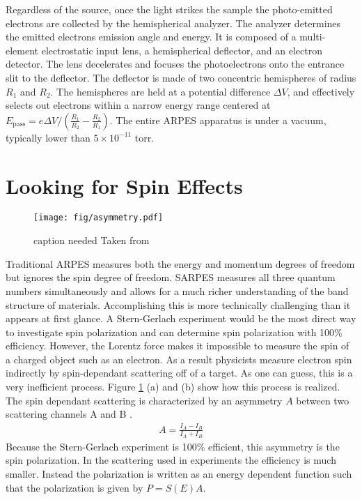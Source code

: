 \documentclass[12pt]{article}
\begin{document}
Regardless of the source, once the light strikes the sample the photo-emitted electrons are collected by the hemispherical analyzer.
The analyzer determines the emitted electrons emission angle and energy.
It is composed of a multi-element electrostatic input lens, a hemispherical deflector, and an electron detector.
The lens decelerates and focuses the photoelectrons onto the entrance slit to the deflector.
The deflector is made of two concentric hemispheres of radius $R_1$ and $R_2$.
The hemispheres are held at a potential difference $\Delta V$, and effectively selects out electrons within a narrow energy range centered at $E_{\text{pass}}=e\Delta V / (\frac{R_1}{R_2}-\frac{R_2}{R_1})$.
The entire ARPES apparatus is under a vacuum, typically lower than $5\times10^{-11}$ torr.

\section{Looking for Spin Effects}
\begin{figure}[h]
  \centering
  \texttt{[image: fig/asymmetry.pdf]}
  \caption[should I put this here?]
  {caption needed Taken from \cite{Okuda-Kimura}}
  \label{fig:asymmetry}
\end{figure}
Traditional ARPES measures both the energy and momentum degrees of freedom but ignores the spin degree of freedom.
SARPES measures all three quantum numbers simultaneously and allows for a much richer understanding of the band structure of materials.
Accomplishing this is more technically challenging than it appears at first glance.
A Stern-Gerlach experiment would be the most direct way to investigate spin polarization and can determine spin polarization with 100\% efficiency.
However, the Lorentz force makes it impossible to measure the spin of a charged object such as an electron.
As a result physicists measure electron spin indirectly by spin-dependant scattering off of a target.
As one can guess, this is a very inefficient process.
Figure \ref{fig:asymmetry} (a) and (b) show how this process is realized.
The spin dependant scattering is characterized by an asymmetry $A$ between two scattering channels A and B \cite{Okuda-Kimura}.
\begin{align}
  A=\frac{I_A-I_B}{I_A+I_B}
\end{align}
Because the Stern-Gerlach experiment is 100\% efficient, this asymmetry is the spin polarization.
In the scattering used in experiments the efficiency is much smaller.
Instead the polarization is written as an energy dependent function such that the polarization is given by $P=S(E)A$.
\end{document}
